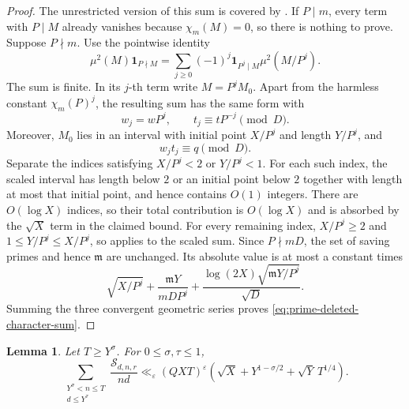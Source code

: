 \documentclass[12pt,reqno]{amsart}
\numberwithin{equation}{section}
\theoremstyle{plain}
\newtheorem{lemma}[theorem]{Lemma}
\theoremstyle{definition}
\theoremstyle{remark}
\begin{document}
\begin{proof}
The unrestricted version of this sum is covered by
\cite[Lemma~3.19]{Zubrilina2025}.
If $P\mid m$, every term with $P\mid M$ already vanishes because $\chi_m(M)=0$, so there is
nothing to prove.
Suppose $P\nmid m$.
Use the pointwise identity
\[
\mu^2(M)\mathbf1_{P\nmid M}
=
\sum_{j\geq0}(-1)^j\mathbf1_{P^j\mid M}\mu^2(M/P^j).
\]
The sum is finite.  In its $j$-th term write $M=P^jM_0$.
Apart from the harmless constant $\chi_m(P)^j$, the resulting sum has the same form with
\[
w_j=wP^j,
\qquad
t_j\equiv tP^{-j}\pmod D.
\]
Moreover, $M_0$ lies in an interval with initial point $X/P^j$ and length $Y/P^j$, and
\[
w_jt_j\equiv q\pmod D.
\]
Separate the indices satisfying $X/P^j<2$ or $Y/P^j<1$.
For each such index, the scaled interval has length below $2$ or an initial point below $2$ together with length at most that initial point, and hence contains $O(1)$ integers.
There are $O(\log X)$ indices, so their total contribution is $O(\log X)$ and is absorbed by the $\sqrt X$ term in the claimed bound.
For every remaining index, $X/P^j\geq2$ and $1\leq Y/P^j\leq X/P^j$, so \cite[Lemma~3.19]{Zubrilina2025} applies to the scaled sum.
Since $P\nmid mD$, the set of saving primes and hence $\mathfrak m$ are unchanged.
Its absolute value is at most a constant times
\[
\sqrt{X/P^j}
+\frac{\mathfrak mY}{mDP^j}
+\frac{\log(2X)\sqrt{\mathfrak mY/P^j}}{\sqrt D}.
\]
Summing the three convergent geometric series proves
\eqref{eq:prime-deleted-character-sum}.
\end{proof}

\begin{lemma}\label{lem:large-n}
Let $T\geq Y^\sigma$.  For $0\leq\sigma,\tau\leq1$,
\[
\sum_{\substack{Y^\sigma<n\leq T\\d\leq Y^\tau}}
\frac{\mathcal S_{d,n,r}}{nd}
\ll_\varepsilon
(QXT)^\varepsilon
\left(
\sqrt X+Y^{1-\sigma/2}+\sqrt Y\,T^{1/4}
\right).
\]
\end{lemma}
\end{document}
